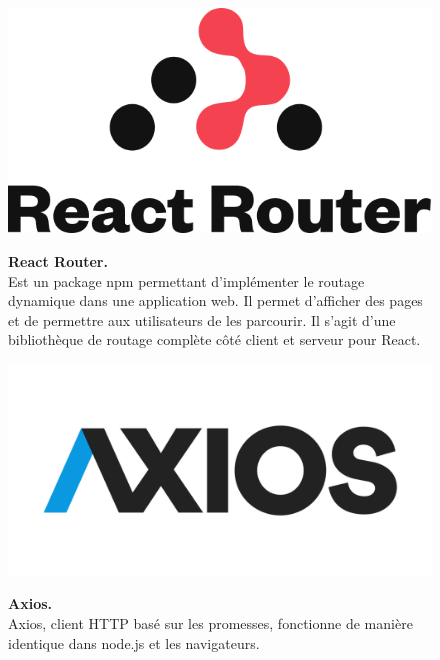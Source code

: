 \begin{figure}[H]
    \centering
    \begin{minipage}[c]{0.3\textwidth}
        \includegraphics[width=\linewidth]{projet/images/diagramme de sequance/images/router-dom.png}
    \end{minipage}
    \hspace{1cm}
    \begin{minipage}[c]{0.6\textwidth}
        \textbf{React Router.}\\[0.5em]
    Est un package npm permettant d'implémenter le routage dynamique dans une application web. Il permet d'afficher des pages et de permettre aux utilisateurs de les parcourir. Il s'agit d'une bibliothèque de routage complète côté client et serveur pour React.  \cite{ref18}
    \end{minipage}
\end{figure}
\vspace{0.5cm}

\begin{figure}[H]
    \centering
    \begin{minipage}[c]{0.3\textwidth}
        \includegraphics[width=\linewidth]{projet/images/diagramme de sequance/Axios.png}
    \end{minipage}
    \hspace{1cm}
    \begin{minipage}[c]{0.6\textwidth}
        \textbf{Axios.}\\[0.5em]
   Axios, client HTTP basé sur les promesses, fonctionne de manière identique dans node.js et les navigateurs. \cite{ref19}
    \end{minipage}
\end{figure}
\vspace{0.5cm}

